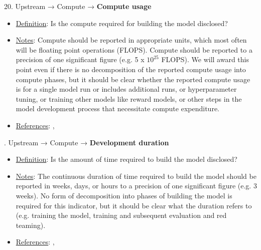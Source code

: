 20. Upstream → Compute → \textbf{Compute usage}
\vspace{-\parskip}
\begin{itemize}
\item
\underline{Definition}: Is the compute required for building the model disclosed?
\item
\underline{Notes}: Compute should be reported in appropriate units, which most often will be floating point operations (FLOPS). Compute should be reported to a precision of one significant figure (e.g. 5 x $10^{25}$ FLOPS). We will award this point even if there is no decomposition of the reported compute usage into compute phases, but it should be clear whether the reported compute usage is for a single model run or includes additional runs, or hyperparameter tuning, or training other models like reward models, or other steps in the model development process that necessitate compute expenditure.
\item
\underline{References}: \citet{henderson2020towards}, \citet{strubell2019energy}
\end{itemize} \vspace{\baselineskip}


. Upstream → Compute → \textbf{Development duration}
\vspace{-\parskip}
\begin{itemize}
\item
\underline{Definition}: Is the amount of time required to build the model disclosed?
\item
\underline{Notes}: The continuous duration of time required to build the model should be reported in weeks, days, or hours to a precision of one significant figure (e.g. 3 weeks). No form of decomposition into phases of building the model is required for this indicator, but it should be clear what the duration refers to (e.g. training the model, training and subsequent evaluation and red teaming).
\item
\underline{References}: \citet{sevilla2022compute}, \citet{hoffmann2022training}
\end{itemize} \vspace{\baselineskip}


